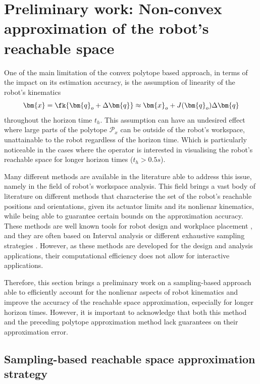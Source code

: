 \section{Preliminary work: Non-convex approximation of the robot's reachable space}
\label{ch:curved}
One of the main limitation of the convex polytope based approach, in terms of the impact on its estimation accuracy, is the assumption of linearity of the robot's kinematics $$\bm{x} = \fk{\bm{q}_o + \Delta{\bm{q}}} \approx \bm{x}_o + J(\bm{q}_o)\Delta \bm{q}$$ throughout the horizon time $t_h$. This assumption can have an undesired effect where large parts of the polytope $\mathcal{P}_x$ can be outside of the robot's workspace, unattainable to the robot regardless of the horizon time. Which is particularly noticeable in the cases where the operator is interested in visualising the robot's reachable space for longer horizon times ($t_h>0.5s$). 

Many different methods are available in the literature able to address this issue, namely in the field of robot's workspace analysis. This field brings a vast body of literature on different methods that characterise the set of the robot's reachable positions and orientations, given its actuator limits and its nonlienar kinematics, while being able to guarantee certain bounds on the approximation accuracy.
These methods are well known tools for robot design and workplace placement \cite{Gosselin1991Synthesis,kucuk2005robot}, and they are often based on Interval analysis \cite{gouttefarde2011interval} or different exhaustive sampling strategies \cite{Vahrenkamp2016}. However, as these methods are developed for the design and analysis applications, their computational efficiency does not allow for interactive applications. 

Therefore, this section brings a preliminary work on a sampling-based approach able to efficiently account for the nonlienar aspects of robot kinematics and improve the accuracy of the reachable space approximation, especially for longer horizon times. However, it is important to acknowledge that both this method and the preceding polytope approximation method lack guarantees on their approximation error.

\subsection{Sampling-based reachable space approximation strategy}

